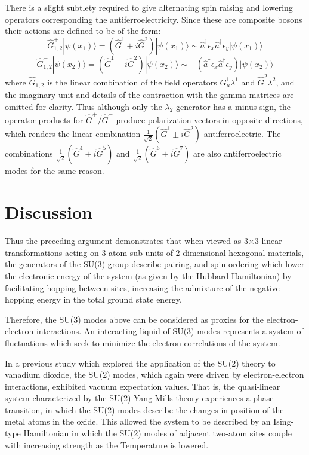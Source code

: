 \documentclass[prb,showpacs,superscriptaddress,titlepage,amsmath,amssymb,twocolumn]{revtex4-1}
\begin{document}
There is a slight subtlety required to give alternating spin raising and lowering operators corresponding the antiferroelectricity. Since these are composite bosons their actions are defined to be of the form:
\begin{equation}
	\hat{G}_{1,2}^{+}|\psi(x_{1})\rangle = (\hat{G}^{1}+i\hat{G}^{2})|\psi(x_{1})\rangle \sim \hat{a}^{\dagger}\epsilon_{x}\hat{a}^{\dagger}\epsilon_{y}|\psi(x_{1})\rangle
\end{equation}
\begin{equation}
	\hat{G}_{1,2}^{-}|\psi(x_{2})\rangle = (\hat{G}^{1}-i\hat{G}^{2})|\psi(x_{2})\rangle \sim -(\hat{a}^{\dagger}\epsilon_{x}\hat{a}^{\dagger}\epsilon_{y})|\psi(x_{2})\rangle
\end{equation}
where $\hat{G}_{1,2}$ is the linear combination of the field operators $G^{1}_{\mu}\lambda^{1}$ and $\hat{G}^{2}\lambda^{2}$, and the imaginary unit and details of the contraction with the gamma matrices are omitted for clarity. Thus although only the $\lambda_{2}$ generator has a minus sign, the operator products for $\hat{G}^{+}/\hat{G}^{-}$ produce polarization vectors in opposite directions, which renders the linear combination $\frac{1}{\sqrt{2}}(\hat{G}^{1}\pm i\hat{G}^{2})$ antiferroelectric. The combinations $\frac{1}{\sqrt{2}}(\hat{G}^{4}\pm i\hat{G}^{5})$ and $\frac{1}{\sqrt{2}}(\hat{G}^{6}\pm i\hat{G}^{7})$ are also antiferroelectric modes for the same reason. 

\section{Discussion}

Thus the preceding argument demonstrates that when viewed as 3$\times$3 linear transformations acting on 3 atom sub-units of 2-dimensional hexagonal materials, the generators of the SU(3) group describe pairing, and spin ordering which lower the electronic energy of the system (as given by the Hubbard Hamiltonian) by facilitating hopping between sites, increasing the admixture of the negative hopping energy in the total ground state energy. 

Therefore, the SU(3) modes above can be considered as proxies for the electron-electron interactions. An interacting liquid of SU(3) modes represents a system of fluctuations which seek to minimize the electron correlations of the system. 

In a previous study\cite{Booth_Wilson_2020} which explored the application of the SU(2) theory to vanadium dioxide, the SU(2) modes, which again were driven by electron-electron interactions, exhibited vacuum expectation values. That is, the quasi-linear system characterized by the SU(2) Yang-Mills theory experiences a phase transition, in which the SU(2) modes describe the changes in position of the metal atoms in the oxide. This allowed the system to be described by an Ising-type Hamiltonian in which the SU(2) modes of adjacent two-atom sites couple with increasing strength as the Temperature is lowered.
\end{document}
